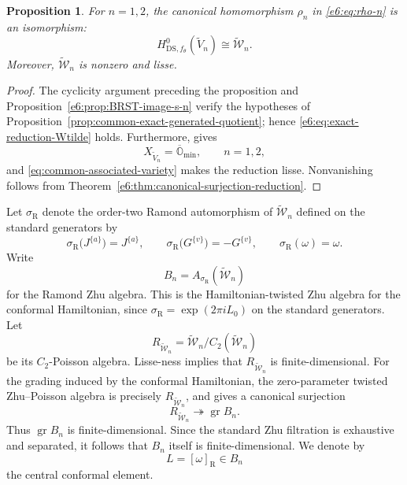 \documentclass[11pt,reqno]{amsart}
\newtheorem{proposition}[theorem]{Proposition}
\theoremstyle{definition}
\theoremstyle{remark}
\begin{document}
\begin{proposition}\label{e6:prop:exact-reduction-Wtilde}
For $n=1,2$, the canonical homomorphism $\rho_n$ in \eqref{e6:eq:rho-n} is an
isomorphism:
\begin{equation}\label{e6:eq:exact-reduction-Wtilde}
  H^0_{\mathrm{DS},f_\theta}(\widetilde V_n)
  \cong
  \widetilde{\mathcal W}_n.
\end{equation}
Moreover, $\widetilde{\mathcal W}_n$ is nonzero and lisse.
\end{proposition}

\begin{proof}
The cyclicity argument preceding the proposition and
Proposition~\ref{e6:prop:BRST-image-s-n} verify the hypotheses of
Proposition~\ref{prop:common-exact-generated-quotient}; hence
\eqref{e6:eq:exact-reduction-Wtilde} holds.  Furthermore,
\cite[Proposition~5.2]{ArakawaMoreau2018} gives
\begin{equation*}
 X_{\widetilde V_n}=\overline{\mathbb O}_{\min},
 \qquad n=1,2,
\end{equation*}
and \eqref{eq:common-associated-variety} makes the reduction lisse.
Nonvanishing follows from Theorem~\ref{e6:thm:canonical-surjection-reduction}.
\end{proof}

Let $\sigma_{\mathrm R}$ denote the order-two Ramond automorphism of
$\widetilde{\mathcal W}_n$ defined on the standard generators by
\begin{equation}\label{e6:eq:Ramond-automorphism}
  \sigma_{\mathrm R}\bigl(J^{\{a\}}\bigr)=J^{\{a\}},
  \qquad
  \sigma_{\mathrm R}\bigl(G^{\{v\}}\bigr)=-G^{\{v\}},
  \qquad
  \sigma_{\mathrm R}(\omega)=\omega.
\end{equation}
Write
\begin{equation*}
  B_n=A_{\sigma_{\mathrm R}}(\widetilde{\mathcal W}_n)
\end{equation*}
for the Ramond Zhu algebra.  This is the Hamiltonian-twisted Zhu algebra
for the conformal Hamiltonian, since
$\sigma_{\mathrm R}=\exp(2\pi iL_0)$ on the standard generators.  Let
\[
  R_{\widetilde{\mathcal W}_n}
  =\widetilde{\mathcal W}_n/C_2(\widetilde{\mathcal W}_n)
\]
be its $C_2$-Poisson algebra.  Lisse-ness implies that
$R_{\widetilde{\mathcal W}_n}$ is finite-dimensional.  For the grading
induced by the conformal Hamiltonian, the zero-parameter twisted Zhu--Poisson
algebra is precisely $R_{\widetilde{\mathcal W}_n}$, and
\cite[Proposition~2.17(c)]{DeSoleKac2006} gives a canonical surjection
\begin{equation*}
  R_{\widetilde{\mathcal W}_n}
  \twoheadrightarrow
  \operatorname{gr}B_n.
\end{equation*}
Thus $\operatorname{gr}B_n$ is finite-dimensional.  Since the standard Zhu
filtration is exhaustive and separated, it follows that $B_n$ itself is
finite-dimensional.
We denote by
\[
  L=[\omega]_{\mathrm R}\in B_n
\]
the central conformal element.
\end{document}

